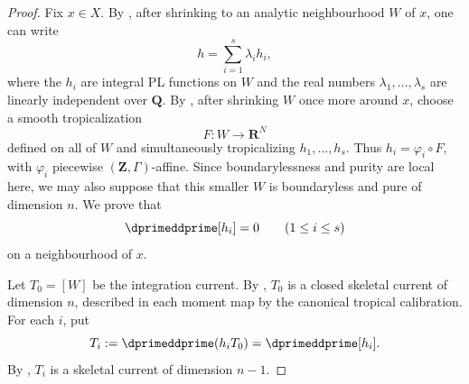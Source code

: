 \begin{proof}
Fix $x\in X$.  By \cite[Proposition~5.8 and Lemma~5.10]{GJR26}, after
shrinking to an analytic neighbourhood $W$ of $x$, one can write
\begin{equation}
\label{eq:ch18-zero-current-independent}
                         h=\sum_{i=1}^{s}\lambda_i h_i,
\end{equation}
where the $h_i$ are integral PL functions on $W$ and the real numbers
$\lambda_1,\ldots,\lambda_s$ are linearly independent over $\mathbf Q$.
By \cite[Proposition~8.3 and \S8.4]{GJR26}, after shrinking $W$ once more
around $x$, choose a smooth tropicalization
\[
                         F:W\longrightarrow\mathbf R^N
\]
defined on all of $W$ and simultaneously tropicalizing
$h_1,\ldots,h_s$.  Thus $h_i=\varphi_i\circ F$, with $\varphi_i$
piecewise $(\mathbf Z,\Gamma)$-affine.  Since boundarylessness and purity are
local here, we may also suppose that this smaller $W$ is boundaryless and
pure of dimension $n$.  We prove that
\begin{equation}
\label{eq:ch18-zero-current-integral}
                         \dprimeddprime[h_i]=0
                         \qquad(1\leq i\leq s)
\end{equation}
on a neighbourhood of $x$.

Let $T_0=[W]$ be the integration current.  By
\cite[Example~7.5.3]{CLD25}, $T_0$ is a closed skeletal current of dimension
$n$, described in each moment map by the canonical tropical calibration.
For each $i$, put
\[
                         T_i:=\dprimeddprime(h_iT_0)
                             =\dprimeddprime[h_i].
\]
By \cite[Theorem~8.10.3]{CLD25}, $T_i$ is a skeletal current of dimension
$n-1$.


\end{proof}
